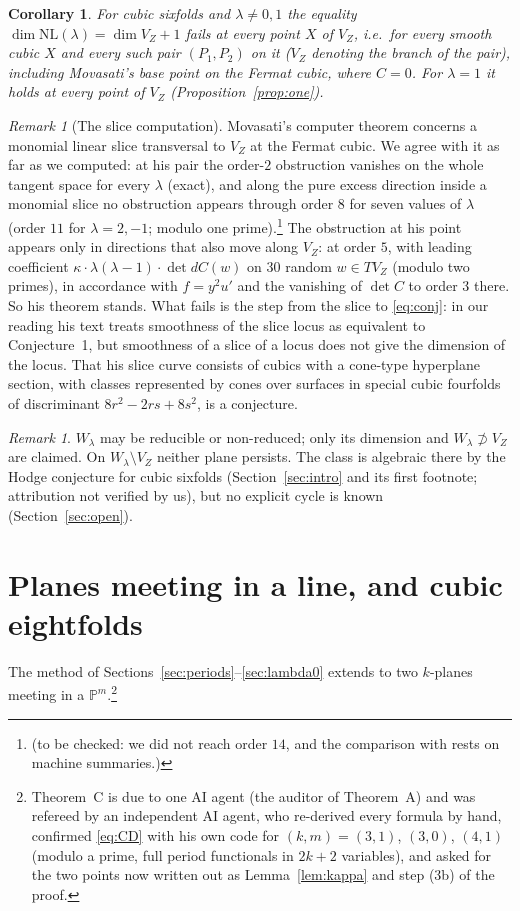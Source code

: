 \documentclass[10pt]{article}
\numberwithin{equation}{section}
\newtheorem{corollary}[theorem]{Corollary}
\theoremstyle{remark}
\newtheorem{remark}[theorem]{Remark}
\newcommand{\PP}{\mathbb{P}}
\newcommand{\NL}{\mathrm{NL}}
\newcommand{\VZ}{V_Z}
\newcommand{\tbc}[1]{\footnote{(to be checked: #1)}}
\begin{document}
\begin{corollary}\label{cor:mov}
For cubic sixfolds and $\lambda\ne0,1$ the equality $\dim\NL(\lambda)=\dim\VZ+1$ fails at every point $X$
of $\VZ$, i.e.\ for every smooth cubic $X$ and every such pair $(P_1,P_2)$ on it \textup{(}$\VZ$ denoting the
branch of the pair\textup{)}, including Movasati's base point on the Fermat cubic, where $C=0$. For $\lambda=1$
it holds at every point of $\VZ$ \textup{(}Proposition~\ref{prop:one}\textup{)}.
\end{corollary}

\begin{remark}[The slice computation]\label{rem:slice}
Movasati's computer theorem concerns a monomial linear slice transversal to $\VZ$ at the Fermat cubic. We agree
with it as far as we computed: at his pair the order-$2$ obstruction vanishes on the whole tangent space for
every $\lambda$ (exact), and along the pure excess direction inside a monomial slice no obstruction appears
through order $8$ for seven values of $\lambda$ (order $11$ for $\lambda=2,-1$; modulo one prime).\tbc{we did
not reach order $14$, and the comparison with \cite{Mo1,Mo2} rests on machine summaries.} The obstruction at his
point appears only in directions that also move along $\VZ$: at order $5$, with leading coefficient
$\kappa\cdot\lambda(\lambda-1)\cdot\det dC(w)$ on $30$ random $w\in T\VZ$ (modulo two primes), in accordance with
$f=y^2u'$ and the vanishing of $\det C$ to order $3$ there. So his theorem stands. What fails is the step from
the slice to \eqref{eq:conj}: in our reading his text treats smoothness of the slice locus as equivalent to
Conjecture~1, but smoothness of a slice of a locus does not give the dimension of the locus. That his slice curve
consists of cubics with a cone-type hyperplane section, with classes represented by cones over surfaces in
special cubic fourfolds of discriminant $8r^2-2rs+8s^2$, is a conjecture.
\end{remark}

\begin{remark}\label{rem:W}
$W_\lambda$ may be reducible or non-reduced; only its dimension and $W_\lambda\not\supset\VZ$ are claimed. On
$W_\lambda\setminus\VZ$ neither plane persists. The class is algebraic there by the Hodge conjecture for cubic
sixfolds (Section~\ref{sec:intro} and its first footnote; attribution not verified by us), but no
explicit cycle is known (Section~\ref{sec:open}).
\end{remark}

\section{Planes meeting in a line, and cubic eightfolds}\label{sec:C}
The method of Sections~\ref{sec:periods}--\ref{sec:lambda0} extends to two $k$-planes meeting in a
$\PP^m$.\footnote{Theorem~C is due to one AI agent (the auditor of Theorem~A) and was refereed by an independent
AI agent, who re-derived every formula by hand, confirmed \eqref{eq:CD} with his own code for $(k,m)=(3,1)$,
$(3,0)$, $(4,1)$ (modulo a prime, full period functionals in $2k+2$ variables), and asked for the two points
now written out as Lemma~\ref{lem:kappa} and step (3b) of the proof.}
\end{document}
